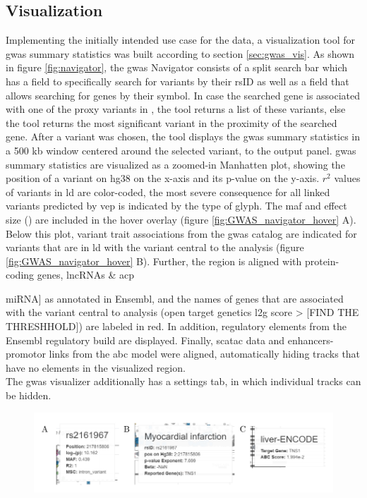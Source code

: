     \subsection{Visualization}
    \label{subsec:result_vis}
    Implementing the initially intended use case for the data, a visualization tool for \ac{gwas} summary statistics was built according to section \ref{sec:gwas_vis}. As shown in figure \ref{fig:navigator}, the \ac{gwas} Navigator consists of a split search bar which has a field to specifically search for variants by their rsID as well as a field that allows searching for genes by their symbol. In case the searched gene is associated with one of the proxy variants in \textcite{aragamDiscoverySystematicCharacterization2021}, the tool returns a list of these variants, else the tool returns the most significant variant in the proximity of the searched gene. After a variant was chosen, the tool displays the \ac{gwas} summary statistics in a 500 kb window centered around the selected variant, to the output panel. \ac{gwas} summary statistics are visualized as a zoomed-in Manhatten plot, showing the position of a variant on \ac{hg38} on the x-axis and its p-value on the y-axis. $r^2$ values of variants in \ac{ld} are color-coded, the most severe consequence for all linked variants predicted by \ac{vep} is indicated by the type of glyph. The \ac{maf} and effect size (\beta) are included in the hover overlay (figure \ref{fig:GWAS_navigator_hover} A). Below this plot, variant trait associations from the \ac{gwas} catalog are indicated for variants that are in \ac{ld} with the variant central to the analysis (figure \ref{fig:GWAS_navigator_hover} B). Further, the region is aligned with protein-coding genes, \acp{lncRNA} \& acp{miRNA] as annotated in Ensembl, and the names of genes that are associated with the variant central to analysis (open target genetics \ac{l2g} score > [FIND THE THRESHHOLD]) are labeled in red. In addition, regulatory elements from the Ensembl regulatory build are displayed. Finally, sc\ac{atac} data and enhancers-promotor links from the \ac{abc} model were aligned, automatically hiding tracks that have no elements in the visualized region.\\
    The \ac{gwas} visualizer additionally has a settings tab, in which individual tracks can be hidden.

    \begin{figure}[h!]
    \capstart
        \centering
        \includegraphics{Abbildung/GWAS_navigator_hover.pdf}


\end{figure}}
